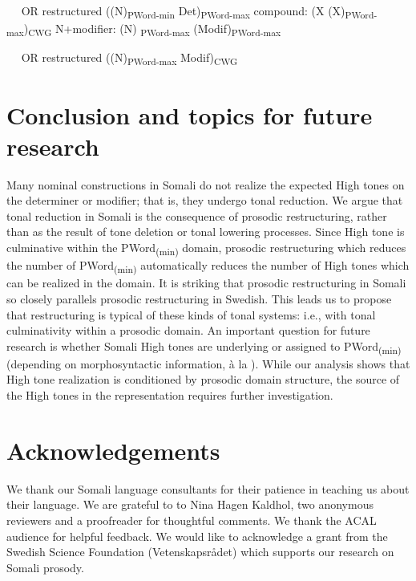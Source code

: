 \documentclass[output=paper]{langscibook}
\begin{document}
  ~~ OR restructured    ((N)\textsubscript{PWord-min} Det)\textsubscript{PWord-max}
\ex compound:        (X (X)\textsubscript{PWord-max})\textsubscript{CWG}
\ex N+modifier:        (N)\textsubscript{ PWord-max} (Modif)\textsubscript{PWord-max} 

  ~~ OR restructured    ((N)\textsubscript{PWord-max} Modif)\textsubscript{CWG}
\z
\z


\section{Conclusion and topics for future research}

\label{sec:downing:5}
Many nominal constructions in Somali do not realize the expected High tones on the determiner or modifier; that is, they undergo tonal reduction. We argue that tonal reduction in Somali is the consequence of prosodic restructuring, rather than as the result of tone deletion or tonal lowering processes. Since High tone is culminative within the PWord\textsubscript{(min)} domain, prosodic restructuring which reduces the number of PWord\textsubscript{(min)} automatically reduces the number of High tones which can be realized in the domain. It is striking that prosodic restructuring in Somali so closely parallels prosodic restructuring in Swedish. This leads us to propose that restructuring is typical of these kinds of tonal systems: i.e., with tonal culminativity within a prosodic domain. An important question for future research is whether Somali High tones are underlying or assigned to PWord\textsubscript{(min)} (depending on morphosyntactic information, à la \citealt{Hyman1981}). While our analysis shows that High tone realization is conditioned by prosodic domain structure, the source of the High tones in the representation requires further investigation. 


\section*{Acknowledgements}
We thank our Somali language consultants for their patience in teaching us about their language. We are grateful to to Nina Hagen Kaldhol, two anonymous reviewers and a proofreader for thoughtful comments. We thank the ACAL audience for helpful feedback. We would like to acknowledge a grant from the Swedish Science Foundation (Vetenskapsrådet) which supports our research on Somali prosody. 


{\sloppy
\printbibliography[heading=subbibliography,notkeyword=this] 
}
\end{document}
